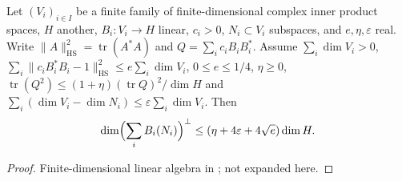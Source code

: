\begin{lemma}\label{geoa:frame-la1}
Let $(V_i)_{i\in I}$ be a finite family of finite-dimensional complex inner product spaces,
$H$ another, $B_i\colon V_i\to H$ linear, $c_i>0$, $N_i\subset V_i$ subspaces, and
$e,\eta,\varepsilon$ real. Write $\|A\|_{\mathrm{HS}}^2=\operatorname{tr}(A^*A)$ and
$Q=\sum_ic_iB_iB_i^*$. Assume $\sum_i\dim V_i>0$,
$\sum_i\|c_iB_i^*B_i-1\|_{\mathrm{HS}}^2\le e\sum_i\dim V_i$, $0\le e\le1/4$, $\eta\ge0$,
$\operatorname{tr}(Q^2)\le(1+\eta)(\operatorname{tr}Q)^2/\dim H$ and
$\sum_i(\dim V_i-\dim N_i)\le\varepsilon\sum_i\dim V_i$. Then
\[
\dim\Bigl(\sum_iB_i(N_i)\Bigr)^{\perp}\le(\eta+4\varepsilon+4\sqrt e)\dim H .
\]
\end{lemma}
\begin{proof}
Finite-dimensional linear algebra in
;
not expanded here.
\end{proof}


